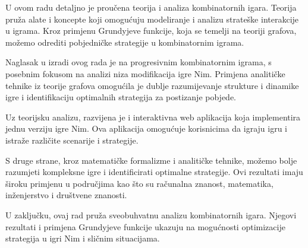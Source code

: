 U ovom radu detaljno je proučena teorija i analiza kombinatornih igara. Teorija pruža alate i koncepte koji omogućuju modeliranje i analizu strateške interakcije u igrama. Kroz primjenu Grundyjeve funkcije, koja se temelji na teoriji grafova, možemo odrediti pobjedničke strategije u kombinatornim igrama.

Naglasak u izradi ovog rada je na progresivnim kombinatornim igrama, s posebnim fokusom na analizi niza modifikacija igre Nim. Primjena analitičke tehnike iz teorije grafova omogućila je dublje razumijevanje strukture i dinamike igre i identifikaciju optimalnih strategija za postizanje pobjede.

Uz teorijsku analizu, razvijena je i interaktivna web aplikacija koja implementira jednu verziju igre Nim. Ova aplikacija omogućuje korisnicima da igraju igru i istraže različite scenarije i strategije. 

S druge strane, kroz matematičke formalizme i analitičke tehnike, možemo bolje razumjeti kompleksne igre i identificirati optimalne strategije. Ovi rezultati imaju široku primjenu u područjima kao što su računalna znanost, matematika, inženjerstvo i društvene znanosti.

U zaključku, ovaj rad pruža sveobuhvatnu analizu kombinatornih igara. Njegovi rezultati i primjena Grundyjeve funkcije ukazuju na mogućnosti optimizacije strategija u igri Nim i sličnim situacijama.